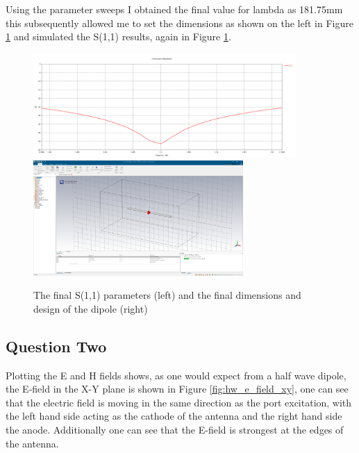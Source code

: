 \documentclass[colorlinks,11pt,a4paper,normalphoto,withhyper,ragged2e]{altareport}
\begin{document}
Using the parameter sweeps I obtained the final value for lambda as 181.75mm this subsequently allowed me to set the dimensions as shown on the left in Figure \ref{fig:hw_s11_dimesions_final} and simulated the S(1,1) results, again in Figure \ref{fig:hw_s11_dimesions_final}.

\begin{figure}[h!]
	\centering
	\hspace{\fill}\includegraphics[width=10cm,valign=c]{Images/hw-lambda-181.75-S1,1.png}\hspace{\fill}\includegraphics[width=8cm,valign=c]{Images/hw-final-dimens.png}\hspace{\fill}
	\caption{The final S(1,1) parameters (left) and the final dimensions and design of the dipole (right)}
	\label{fig:hw_s11_dimesions_final}
\end{figure}




\subsection{Question Two}

Plotting the E and H fields shows, as one would expect from a half wave dipole, the E-field in the X-Y plane is shown in Figure \ref{fig:hw_e_field_xy}, one can see that the electric field is moving in the same direction as the port excitation, with the left hand side acting as the cathode of the antenna and the right hand side the anode. Additionally one can see that the E-field is strongest at the edges of the antenna. \linebreak
\end{document}
